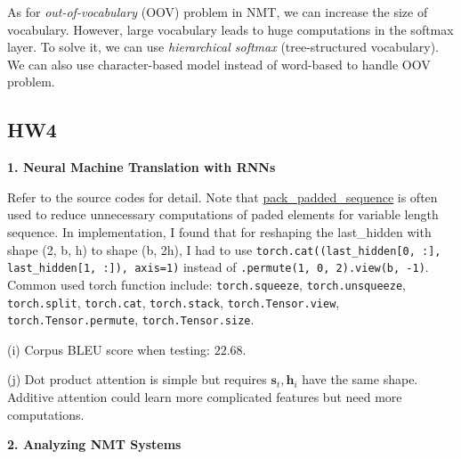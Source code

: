 As for \emph{out-of-vocabulary} (OOV) problem in NMT, we can increase the size of vocabulary.
However, large vocabulary leads to huge computations in the softmax layer.
To solve it, we can use \emph{hierarchical softmax} (tree-structured vocabulary).
We can also use character-based model instead of word-based to handle OOV problem.

\subsection{HW4}
\textbf{1. Neural Machine Translation with RNNs}

Refer to the source codes for detail.
Note that \href{https://stackoverflow.com/questions/51030782/why-do-we-pack-the-sequences-in-pytorch}{pack\_padded\_sequence} is often used to reduce unnecessary computations of paded elements for variable length sequence.
In implementation, I found that for reshaping the last\_hidden with shape (2, b, h) to shape (b, 2h), I had to use \texttt{torch.cat((last\_hidden[0, :], last\_hidden[1, :]), axis=1)} instead of \texttt{.permute(1, 0, 2).view(b, -1)}.
Common used torch function include: \texttt{torch.squeeze}, \texttt{torch.unsqueeze}, \texttt{torch.split}, \texttt{torch.cat}, \texttt{torch.stack}, \texttt{torch.Tensor.view}, \texttt{torch.Tensor.permute}, \texttt{torch.Tensor.size}.

(i) Corpus BLEU score when testing: $22.68$.

(j) Dot product attention is simple but requires $\bm{s}_t, \bm{h}_i$ have the same shape. Additive attention could learn more complicated features but need more computations. 

\textbf{2. Analyzing NMT Systems}

